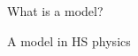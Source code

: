 \documentclass[notes,11pt, aspectratio=169, xcolor=table]{beamer}
\begin{document}
\begin{frame}{What is a model?}
  \end{frame}

\begin{frame}{A model in HS physics}
    
    \end{frame}
\end{document}
